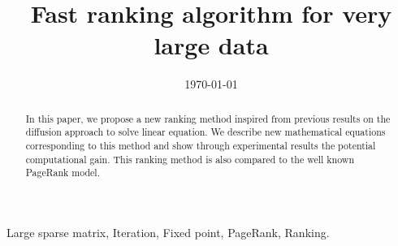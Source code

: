 \documentclass[conference]{IEEEtran}
\begin{document}
\title{Fast ranking algorithm for very large data}
\author{
}

\date{\today}
\maketitle

\begin{abstract}
In this paper, we propose a new ranking method inspired from previous results
on the diffusion approach to solve linear equation.
We describe new mathematical equations corresponding to this method and show
through experimental results the potential computational gain.
This ranking method is also compared to the well known PageRank model.
\end{abstract}
\begin{IEEEkeywords}
Large sparse matrix, Iteration, Fixed point, PageRank, Ranking.
\end{IEEEkeywords}
\end{document}
